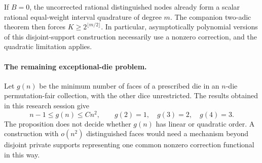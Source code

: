\documentclass[11pt]{article}
\begin{document}
If $B=0$, the uncorrected rational distinguished nodes already form a
scalar rational equal-weight interval quadrature of degree $m$.
The companion two-adic theorem then forces
$K\geq2^{\lfloor m/2\rfloor}$. In particular, asymptotically polynomial
versions of this disjoint-support construction necessarily use a nonzero
correction, and the quadratic limitation applies.

\paragraph{The remaining exceptional-die problem.}
Let $g(n)$ be the minimum number of faces of a prescribed die in an
$n$-die permutation-fair collection, with the other dice unrestricted.
The results obtained in this research session give
\[
 n-1\leq g(n)\leq Cn^2,
 \qquad g(2)=1,\quad g(3)=2,\quad g(4)=3.
\]
The proposition does not decide whether $g(n)$ has linear or quadratic
order. A construction with $o(n^2)$ distinguished faces would need a
mechanism beyond disjoint private supports representing one common
nonzero correction functional in this way.
\end{document}

